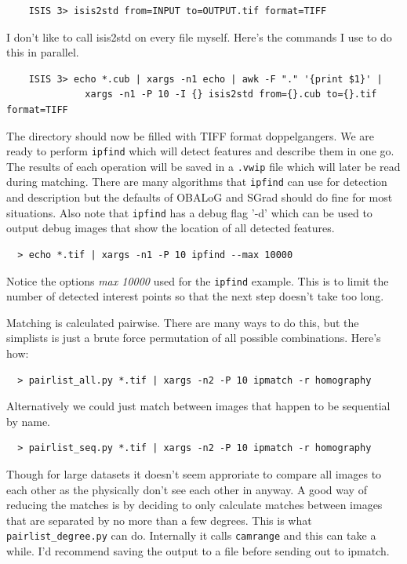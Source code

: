 \begin{verbatim}
    ISIS 3> isis2std from=INPUT to=OUTPUT.tif format=TIFF
\end{verbatim}

I don't like to call isis2std on every file myself. Here's the
commands I use to do this in parallel.

\begin{verbatim}
    ISIS 3> echo *.cub | xargs -n1 echo | awk -F "." '{print $1}' |
              xargs -n1 -P 10 -I {} isis2std from={}.cub to={}.tif format=TIFF
\end{verbatim}

The directory should now be filled with TIFF format doppelgangers. We
are ready to perform \texttt{ipfind} which will detect features and
describe them in one go. The results of each operation will be saved
in a \texttt{.vwip} file which will later be read during
matching. There are many algorithms that \texttt{ipfind} can use for
detection and description but the defaults of OBALoG and SGrad should
do fine for most situations. Also note that \texttt{ipfind} has a
debug flag '-d' which can be used to output debug images that show the
location of all detected features.

\begin{verbatim}
  > echo *.tif | xargs -n1 -P 10 ipfind --max 10000
\end{verbatim}

Notice the options \emph{\-\-max 10000} used for the \texttt{ipfind}
example. This is to limit the number of detected interest points so
that the next step doesn't take too long.

Matching is calculated pairwise. There are many ways to do this, but
the simplists is just a brute force permutation of all possible
combinations. Here's how:

\begin{verbatim}
  > pairlist_all.py *.tif | xargs -n2 -P 10 ipmatch -r homography
\end{verbatim}

Alternatively we could just match between images that happen to be
sequential by name.

\begin{verbatim}
  > pairlist_seq.py *.tif | xargs -n2 -P 10 ipmatch -r homography
\end{verbatim}

Though for large datasets it doesn't seem approriate to compare all
images to each other as the physically don't see each other in
anyway. A good way of reducing the matches is by deciding to only
calculate matches between images that are separated by no more than a
few degrees. This is what \texttt{pairlist\_degree.py} can
do. Internally it calls \texttt{camrange} and this can take a
while. I'd recommend saving the output to a file before sending out to
ipmatch.

